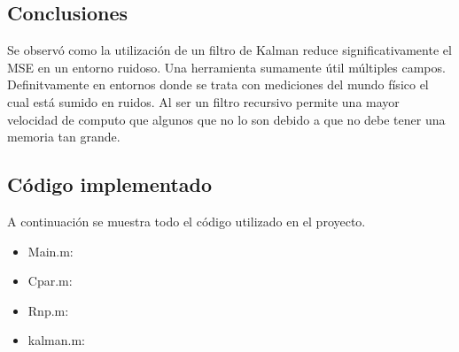 \subsection{Conclusiones}
Se observó como la utilización de un filtro de Kalman reduce significativamente el MSE en un entorno ruidoso. Una herramienta sumamente útil múltiples campos. Definitvamente en entornos donde se trata con mediciones del mundo físico el cual está sumido en ruidos.
Al ser un filtro recursivo permite una mayor velocidad de computo que algunos que no lo son debido a que no debe tener una memoria tan grande.

\subsection{Código implementado}
A continuación se muestra todo el código utilizado en el proyecto.
\begin{itemize}
\item Main.m:
	
	
\item Cpar.m:
	
	
\item Rnp.m:
	
	
\item kalman.m:
	

\end{itemize}

